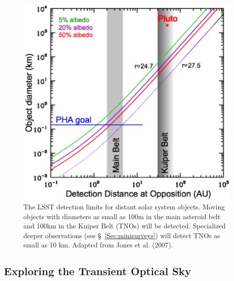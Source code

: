 \documentclass{emulateapj}
\begin{document}
\begin{figure}
\includegraphics[width=1.0\hsize,clip]{Af9.ps}
\caption{The LSST detection limits for distant solar system objects.
Moving objects with diameters as small as 100m in the main asteroid belt and 
100km in the Kuiper Belt (TNOs) will be detected. Specialized deeper observations 
(see \S~\ref{Sec:minisurveys}) will detect TNOs as small as 10 km. Adapted from 
Jones et al. (2007).} 
\label{Fig:Af9}
\end{figure}


\subsection{ Exploring the Transient Optical Sky }
\end{document}
